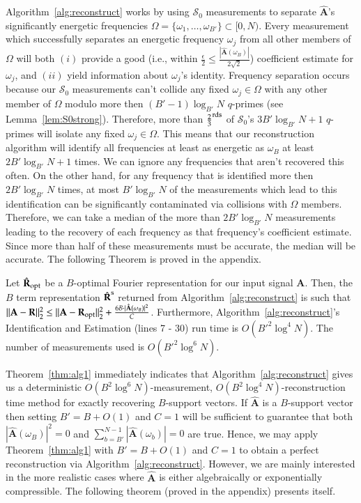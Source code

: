 \documentclass{article}
\begin{document}
Algorithm~\ref{alg:reconstruct} works by using $\mathcal{S}_{0}$ measurements to separate $\hat{\textbf{A}}$'s significantly energetic frequencies $\Omega = \{ \omega_{1}, \dots, \omega_{B'} \} \subset [0,N)$.  Every measurement which successfully separates an energetic frequency $\omega_{j}$ from all other members of $\Omega$ will both $(i)$ provide a good (i.e., within $\frac{\epsilon}{2} \leq \frac{|\hat{\textbf{A}}(\omega_{B})|}{2 \sqrt{2}}$) coefficient estimate for $\omega_{j}$, and $(ii)$ yield information about $\omega_{j}$'s identity.  Frequency separation occurs because our $\mathcal{S}_{0}$ measurements can't collide any fixed $\omega_{j} \in \Omega$ with any other member of $\Omega$ modulo more then $(B' - 1) \log_{B'} N$ $q$-primes (see Lemma~\ref{lem:S0strong}).  Therefore, more than $\frac{2}{3}^{\rm rds}$ of $\mathcal{S}_{0}$'s $3B'\log_{B'} N + 1$ $q$-primes will isolate any fixed $\omega_{j} \in \Omega$.  This means that our reconstruction algorithm will identify all frequencies at least as energetic as $\omega_{B}$ at least $2B'\log_{B'} N + 1$ times.  We can ignore any frequencies that aren't recovered this often.  On the other hand, for any frequency that is identified more then $2B'\log_{B'} N$ 
times, at most $B'\log_{B'} N$ of the measurements which lead to this identification can be significantly contaminated via collisions with $\Omega$ members.  Therefore, we can take a median of the more than $2B'\log_{B'} N$ measurements leading to the recovery of each frequency as that frequency's coefficient estimate.  Since more than half of these measurements must be accurate, the median will be accurate.  The following Theorem is proved in the appendix.

\begin{Theorem}
Let $\hat{\textbf{R}}_{\rm opt}$ be a $B$-optimal Fourier representation for our input signal \textbf{A}.  Then, the $B$ term representation $\hat{\textbf{R}}^{\rm s}$ returned from Algorithm~\ref{alg:reconstruct} is such that $\| \textbf{A} - \textbf{R}\|^{2}_{2} \leq \| \textbf{A} - \textbf{R}_{\rm opt} \|^{2}_{2} + \frac{6 B \cdot |\hat{\textbf{A}}(\omega_{B})|^{2}}{C}$.  Furthermore, Algorithm~\ref{alg:reconstruct}'s Identification and Estimation (lines 7 - 30) run time is $O(B'^{2} \log^{4} N )$.  The number of measurements used is $O( B'^{2} \log^{6} N )$.
\label{thm:alg1}
\end{Theorem}

Theorem~\ref{thm:alg1} immediately indicates that Algorithm~\ref{alg:reconstruct} gives us a deterministic $O(B^{2} \log^{6} N)$-measurement, $O(B^{2} \log^{4} N)$-reconstruction time method for exactly recovering $B$-support vectors.  If $\hat{\textbf{A}}$ is a $B$-support vector then setting $B' = B + O(1)$ and $C = 1$ will be sufficient to guarantee that both $|\hat{\textbf{A}}(\omega_{B})|^{2} = 0$ and $\sum^{N-1}_{b=B'} | \hat{\textbf{A}}(\omega_{b}) | = 0$ are true.  Hence, we may apply Theorem~\ref{thm:alg1} with $B' = B + O(1)$ and $C = 1$ to obtain a perfect reconstruction via Algorithm~\ref{alg:reconstruct}.  However, we are mainly interested in the more realistic cases where $\hat{\textbf{A}}$ is either algebraically or exponentially compressible.  The following theorem (proved in the appendix) presents itself.
\end{document}
